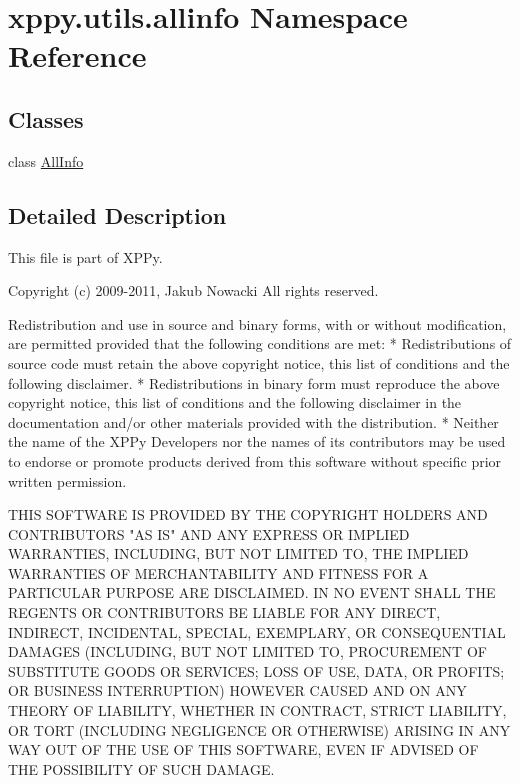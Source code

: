 \hypertarget{namespacexppy_1_1utils_1_1allinfo}{}\section{xppy.\+utils.\+allinfo Namespace Reference}
\label{namespacexppy_1_1utils_1_1allinfo}
\subsection*{Classes}
\begin{DoxyCompactItemize}
\item 
class \mbox{\hyperlink{classxppy_1_1utils_1_1allinfo_1_1_all_info}{All\+Info}}
\end{DoxyCompactItemize}


\subsection{Detailed Description}
\begin{DoxyVerb}This file is part of XPPy.

Copyright (c) 2009-2011, Jakub Nowacki
All rights reserved.

Redistribution and use in source and binary forms, with or without
modification, are permitted provided that the following conditions are met:
    * Redistributions of source code must retain the above copyright
      notice, this list of conditions and the following disclaimer.
    * Redistributions in binary form must reproduce the above copyright
      notice, this list of conditions and the following disclaimer in the
      documentation and/or other materials provided with the distribution.
    * Neither the name of the XPPy Developers nor the
      names of its contributors may be used to endorse or promote products
      derived from this software without specific prior written permission.

THIS SOFTWARE IS PROVIDED BY THE COPYRIGHT HOLDERS AND CONTRIBUTORS "AS IS" AND
ANY EXPRESS OR IMPLIED WARRANTIES, INCLUDING, BUT NOT LIMITED TO, THE IMPLIED
WARRANTIES OF MERCHANTABILITY AND FITNESS FOR A PARTICULAR PURPOSE ARE
DISCLAIMED. IN NO EVENT SHALL THE REGENTS OR CONTRIBUTORS BE LIABLE FOR ANY
DIRECT, INDIRECT, INCIDENTAL, SPECIAL, EXEMPLARY, OR CONSEQUENTIAL DAMAGES
(INCLUDING, BUT NOT LIMITED TO, PROCUREMENT OF SUBSTITUTE GOODS OR SERVICES;
LOSS OF USE, DATA, OR PROFITS; OR BUSINESS INTERRUPTION) HOWEVER CAUSED AND
ON ANY THEORY OF LIABILITY, WHETHER IN CONTRACT, STRICT LIABILITY, OR TORT
(INCLUDING NEGLIGENCE OR OTHERWISE) ARISING IN ANY WAY OUT OF THE USE OF THIS
SOFTWARE, EVEN IF ADVISED OF THE POSSIBILITY OF SUCH DAMAGE.
\end{DoxyVerb}
 